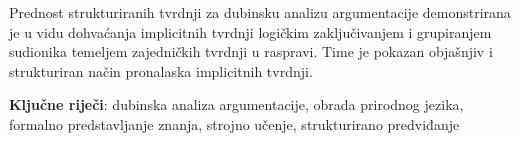 Prednost strukturiranih tvrdnji za dubinsku analizu argumentacije 
demonstrirana je u vidu dohvaćanja implicitnih tvrdnji logičkim
zaključivanjem i grupiranjem sudionika temeljem zajedničkih
tvrdnji u raspravi. Time je pokazan objašnjiv i strukturiran
način pronalaska implicitnih tvrdnji.  

\vspace{1cm}
\textbf{Ključne riječi}:  
dubinska analiza argumentacije, obrada prirodnog jezika,
formalno predstavljanje znanja, 
strojno učenje, strukturirano predviđanje
